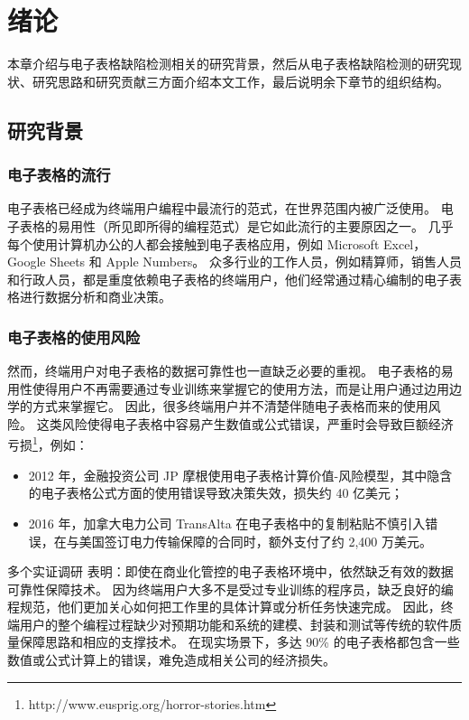 \chapter{绪论}\label{introduction}
本章介绍与电子表格缺陷检测相关的研究背景，然后从电子表格缺陷检测的研究现状、研究思路和研究贡献三方面介绍本文工作，最后说明余下章节的组织结构。


\section{研究背景}
\subsection{电子表格的流行}
电子表格已经成为终端用户编程中最流行的范式，在世界范围内被广泛使用。
电子表格的易用性（所见即所得的编程范式）是它如此流行的主要原因之一。
几乎每个使用计算机办公的人都会接触到电子表格应用，例如 Microsoft Excel，Google Sheets 和 Apple Numbers。
众多行业的工作人员，例如精算师，销售人员和行政人员，都是重度依赖电子表格的终端用户\cite{scaffidi2005estimating}，他们经常通过精心编制的电子表格进行数据分析和商业决策。

\subsection{电子表格的使用风险}
然而，终端用户对电子表格的数据可靠性也一直缺乏必要的重视。
电子表格的易用性使得用户不再需要通过专业训练来掌握它的使用方法，而是让用户通过边用边学的方式来掌握它。
因此，很多终端用户并不清楚伴随电子表格而来的使用风险。
这类风险使得电子表格中容易产生数值或公式错误，严重时会导致巨额经济亏损\footnote{http://www.eusprig.org/horror-stories.htm}，例如：

\begin{itemize}
    \item 2012 年，金融投资公司 JP 摩根使用电子表格计算价值-风险模型，其中隐含的电子表格公式方面的使用错误导致决策失效，损失约 40 亿美元；
    \item 2016 年，加拿大电力公司 TransAlta 在电子表格中的复制粘贴不慎引入错误，在与美国签订电力传输保障的合同时，额外支付了约 2,400 万美元。
\end{itemize}

多个实证调研 \cite{panko2016we,powell2009impact} 表明：即使在商业化管控的电子表格环境中，依然缺乏有效的数据可靠性保障技术。
因为终端用户大多不是受过专业训练的程序员，缺乏良好的编程规范，他们更加关心如何把工作里的具体计算或分析任务快速完成。
因此，终端用户的整个编程过程缺少对预期功能和系统的建模、封装和测试等传统的软件质量保障思路和相应的支撑技术。
在现实场景下，多达 90\% 的电子表格都包含一些数值或公式计算上的错误\cite{rajalingham2008classification}，难免造成相关公司的经济损失。


